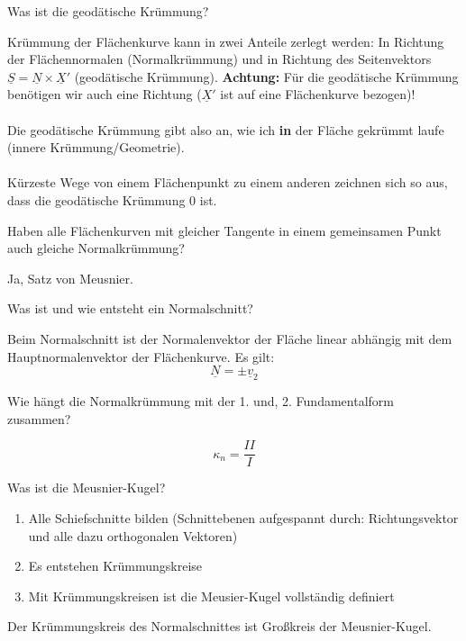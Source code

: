 \documentclass[twocolumn, fontsize=8pt, DIV=1]{scrartcl}
\begin{document}
\begin{framed}
    Was ist die geodätische Krümmung?
\end{framed}
Krümmung der Flächenkurve kann in zwei Anteile zerlegt werden: In Richtung der Flächennormalen (Normalkrümmung) und in Richtung des \glqq Seitenvektors\grqq\ $\underline{S} = \underline{N} \times \underline{X}'$ (geodätische Krümmung). \textbf{Achtung:} Für die geodätische Krümmung benötigen wir auch eine Richtung ($\underline{X}'$ ist auf eine Flächenkurve bezogen)!\\
\\
Die geodätische Krümmung gibt also an, wie ich \textbf{in} der Fläche gekrümmt laufe (innere Krümmung/Geometrie).\\
\\
Kürzeste Wege von einem Flächenpunkt zu einem anderen zeichnen sich so aus, dass die geodätische Krümmung $0$ ist.



\begin{framed}
    Haben alle Flächenkurven mit gleicher Tangente in einem gemeinsamen Punkt auch gleiche Normalkrümmung?
\end{framed}
Ja, Satz von Meusnier.



\begin{framed}
    Was ist und wie entsteht ein Normalschnitt?
\end{framed}
Beim Normalschnitt ist der Normalenvektor der Fläche linear abhängig mit dem Hauptnormalenvektor der Flächenkurve. Es gilt:
\[
    \underline{N} = \pm \underline{v}_2
\]



\begin{framed}
    Wie hängt die Normalkrümmung mit der 1. und, 2. Fundamentalform zusammen?
\end{framed}
\vspace{-1em}
\[
    \kappa_n = \frac{II}{I}
\]



\begin{framed}
    Was ist die Meusnier-Kugel?
\end{framed}
\begin{enumerate}
    \item Alle Schiefschnitte bilden (Schnittebenen aufgespannt durch: Richtungsvektor und alle dazu orthogonalen Vektoren)
    \item Es entstehen Krümmungskreise
    \item Mit Krümmungskreisen ist die Meusier-Kugel vollständig definiert
\end{enumerate}
Der Krümmungskreis des Normalschnittes ist Großkreis der Meusnier-Kugel.
\end{document}
